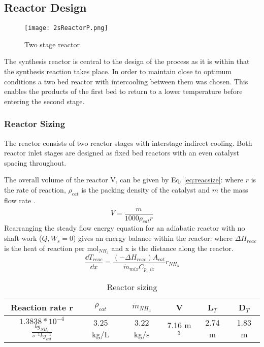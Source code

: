 \subsection{Reactor Design}
\begin{wrapfigure}{r}{0.41\textwidth}
		\centering
		\texttt{[image: 2sReactorP.png]}
		\caption{Two stage reactor}
\end{wrapfigure}

The synthesis reactor is central to the design of the process as it is within that the synthesis reaction takes place. In order to maintain close to optimum conditions  a two bed reactor with intercooling between them was chosen. This enables the products of the first bed to return to a lower temperature before entering the second stage.

\subsubsection{Reactor Sizing}
The reactor consists of two reactor stages with interstage indirect cooling. Both reactor inlet stages are designed as fixed bed reactors with an even catalyst spacing throughout. 

The overall volume of the reactor V, can be given by Eq. \ref{eq:reacsize}: where $r$ is the rate of reaction, $\rho_{cat}$ is the packing density of the catalyst and $\dot{m}$ the mass flow rate \cite{Banares-alcantara2014}.
\begin{equation}
\label{eq:reacsize}
	V = \frac{\dot{m}}{1000\rho_{cat}r}
\end{equation}
Rearranging the steady flow energy equation for an adiabatic reactor with no shaft work ($Q,W_s=0$) gives an energy balance within the reactor: where $\Delta H_{reac}$ is the heat of reaction per mol$_{NH_3}$ and x is the distance along the reactor.
\begin{equation}
\frac{\dd T_{reac}}{\dd x} = \frac{(-\Delta H_{reac})A_{cat}}{\dot{m}_{mix}C_{p_mix}}r_{NH_3}
\end{equation}

\begin{table}[!htbp]
	\begin{center}
		\caption{Reactor sizing\label{tab:reacreq}}
		\begin{tabular}{|c|c|c|c|c|c|}
			\hline
			Reaction rate r& $\rho_{cat}$ & $\dot{m}_{NH_3}$ & V  & L$_T$ & D$_T$ \\ \hline
			$1.3838*10^{-4}$ $\frac{kg_{NH_3}}{s^{-1}kg_{cat}^{-1}}$       & 3.25 kg/L         & 3.22 kg/s                      & 7.16 m$^3$ & 2.74 m & 1.83 m \\ \hline
		\end{tabular}
	\end{center}
\end{table}

